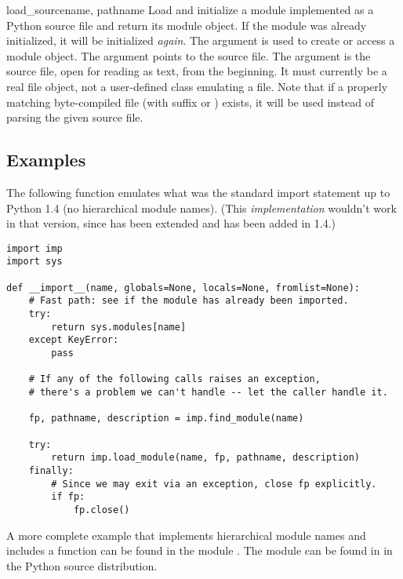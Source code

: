 \begin{funcdesc}{load_source}{name, pathname}
Load and initialize a module implemented as a Python source file and
return its module object.  If the module was already initialized, it
will be initialized \emph{again}.  The  argument is used to
create or access a module object.  The  argument points
to the source file.  The  argument is the source
file, open for reading as text, from the beginning.
It must currently be a real file
object, not a user-defined class emulating a file.  Note that if a
properly matching byte-compiled file (with suffix  or
) exists, it will be used instead of parsing the given
source file.
\end{funcdesc}


\subsection{Examples}
\label{examples-imp}

The following function emulates what was the standard import statement
up to Python 1.4 (no hierarchical module names).  (This
\emph{implementation} wouldn't work in that version, since
 has been extended and
 has been added in 1.4.)

\begin{verbatim}
import imp
import sys

def __import__(name, globals=None, locals=None, fromlist=None):
    # Fast path: see if the module has already been imported.
    try:
        return sys.modules[name]
    except KeyError:
        pass

    # If any of the following calls raises an exception,
    # there's a problem we can't handle -- let the caller handle it.

    fp, pathname, description = imp.find_module(name)
    
    try:
        return imp.load_module(name, fp, pathname, description)
    finally:
        # Since we may exit via an exception, close fp explicitly.
        if fp:
            fp.close()
\end{verbatim}

A more complete example that implements hierarchical module names and
includes a  function can be
found in the module .  The
 module can be found in  in the
Python source distribution.

